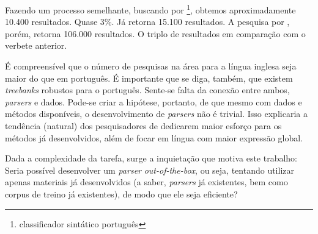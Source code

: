 Fazendo um processo semelhante, buscando por \footnote{classificador sintático português}, obtemos aproximadamente 10.400 resultados. Quase 3\%.
Já  retorna 15.100 resultados. A pesquisa por  , porém, retorna 106.000 resultados. O triplo de resultados em comparação com o verbete anterior.


É compreensível que o número de pesquisas na área para a língua inglesa seja maior do que em português. É importante que se diga, também, que existem \textit{treebanks} robustos para o português. Sente-se falta da conexão entre ambos, \textit{parsers} e dados. Pode-se criar a hipótese, portanto, de que mesmo com dados e métodos disponíveis, o desenvolvimento de \textit{parsers} não é trivial. Isso explicaria a tendência (natural) dos pesquisadores de dedicarem maior esforço para os métodos já desenvolvidos, além de focar em língua com maior expressão global.

Dada a complexidade da tarefa, surge a inquietação que motiva este trabalho: Seria possível desenvolver um \textit{parser} \textit{out-of-the-box}, ou seja, tentando utilizar apenas materiais já desenvolvidos (a saber, \textit{parsers} já existentes, bem como corpus de treino já existentes), de modo que ele seja eficiente?

